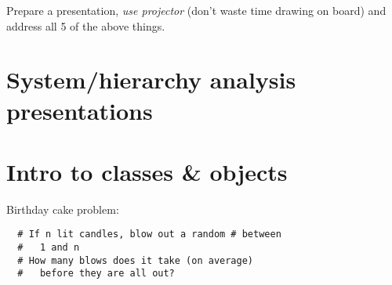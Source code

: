 \documentclass{article}
\begin{document}
Prepare a presentation, \emph{use projector} (don't waste time drawing
on board) and address all 5 of the above things.

\section{System/hierarchy analysis presentations}

\newpage
\section{Intro to classes \& objects}

Birthday cake problem:
\begin{verbatim}
  # If n lit candles, blow out a random # between
  #   1 and n
  # How many blows does it take (on average)
  #   before they are all out?
\end{verbatim}
\end{document}

